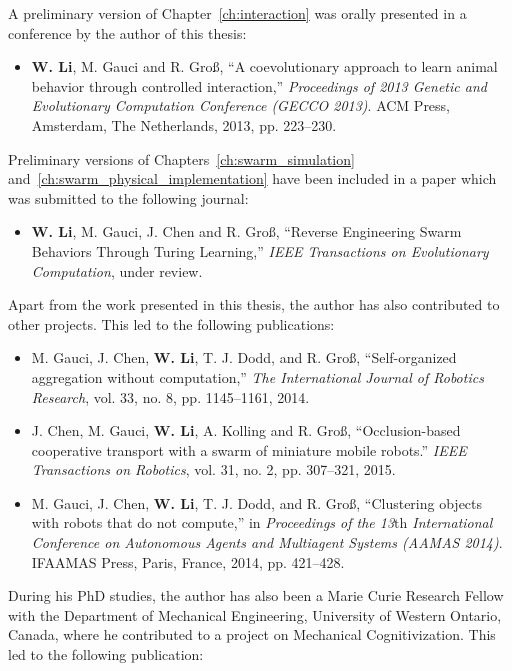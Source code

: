 A preliminary version of Chapter~\ref{ch:interaction} was orally presented in a conference by the author of this thesis:
\begin{itemize}
%
\item \textbf{W. Li}, M. Gauci and R. Gro{\ss}, ``A coevolutionary approach to learn animal behavior through controlled interaction,'' \textit{Proceedings of 2013 Genetic and Evolutionary Computation Conference (GECCO 2013)}. ACM Press, Amsterdam, The Netherlands, 2013, pp. 223--230.
%
\end{itemize}

Preliminary versions of Chapters~\ref{ch:swarm_simulation} and~\ref{ch:swarm_physical_implementation} have been included in a paper which was submitted to the following journal:
\begin{itemize}
%
\item \textbf{W. Li}, M. Gauci, J. Chen and R. Gro{\ss}, ``Reverse Engineering Swarm Behaviors Through Turing Learning,'' \textit{IEEE Transactions on Evolutionary Computation}, under review.
%
\end{itemize}

Apart from the work presented in this thesis, the author has also contributed to other projects. This led to the following publications:

\begin{itemize}
%
\item M. Gauci, J. Chen, \textbf{W. Li}, T. J. Dodd, and R. Gro{\ss}, ``Self-organized aggregation without computation,'' \textit{The International Journal of Robotics Research}, vol. 33, no. 8, pp. 1145--1161, 2014.
%
\item J. Chen, M. Gauci, \textbf{W. Li}, A. Kolling and R. Gro{\ss}, ``Occlusion-based cooperative transport with a swarm of miniature mobile robots.''\textit{ IEEE Transactions on Robotics}, vol. 31, no. 2, pp. 307--321, 2015.
%
\item M. Gauci, J. Chen, \textbf{W. Li}, T. J. Dodd, and R. Gro{\ss}, ``Clustering objects with robots that do not compute,'' in \textit{Proceedings of the 13${\textrm{th}}$ International Conference on Autonomous Agents and Multiagent Systems (AAMAS 2014)}. IFAAMAS Press, Paris, France, 2014, pp. 421--428.
%
\end{itemize}

During his PhD studies, the author has also been a Marie Curie Research Fellow with the Department of Mechanical Engineering, University of Western Ontario, Canada, where he contributed to a project on Mechanical Cognitivization. This led to the following publication:

